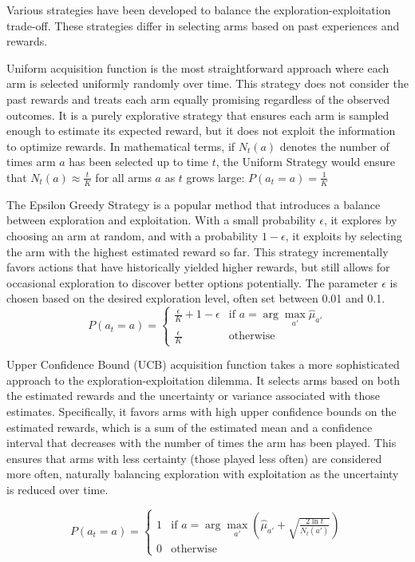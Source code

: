 \documentclass[
  letterpaper,
  DIV=11,
  numbers=noendperiod,
  oneside]{scrreprt}
\theoremstyle{remark}
\begin{document}
Various strategies have been developed to balance the
exploration-exploitation trade-off. These strategies differ in selecting
arms based on past experiences and rewards.

Uniform acquisition function is the most straightforward approach where
each arm is selected uniformly randomly over time. This strategy does
not consider the past rewards and treats each arm equally promising
regardless of the observed outcomes. It is a purely explorative strategy
that ensures each arm is sampled enough to estimate its expected reward,
but it does not exploit the information to optimize rewards. In
mathematical terms, if \(N_t(a)\) denotes the number of times arm \(a\)
has been selected up to time \(t\), the Uniform Strategy would ensure
that \(N_t(a) \approx \frac{t}{K}\) for all arms \(a\) as \(t\) grows
large: \(P(a_t = a) = \frac{1}{K}\)

The Epsilon Greedy Strategy is a popular method that introduces a
balance between exploration and exploitation. With a small probability
\(\epsilon\), it explores by choosing an arm at random, and with a
probability \(1 - \epsilon\), it exploits by selecting the arm with the
highest estimated reward so far. This strategy incrementally favors
actions that have historically yielded higher rewards, but still allows
for occasional exploration to discover better options potentially. The
parameter \(\epsilon\) is chosen based on the desired exploration level,
often set between 0.01 and 0.1. \[P(a_t = a) =
\begin{cases} 
\frac{\epsilon}{K} + 1 - \epsilon & \text{if } a = \arg\max_{a'} \hat{\mu}_{a'} \\
\frac{\epsilon}{K} & \text{otherwise}
\end{cases}\]

Upper Confidence Bound (UCB) acquisition function takes a more
sophisticated approach to the exploration-exploitation dilemma. It
selects arms based on both the estimated rewards and the uncertainty or
variance associated with those estimates. Specifically, it favors arms
with high upper confidence bounds on the estimated rewards, which is a
sum of the estimated mean and a confidence interval that decreases with
the number of times the arm has been played. This ensures that arms with
less certainty (those played less often) are considered more often,
naturally balancing exploration with exploitation as the uncertainty is
reduced over time.

\[P(a_t = a) =
\begin{cases} 
1 & \text{if } a = \arg\max_{a'} \left( \hat{\mu}_{a'} + \sqrt{\frac{2 \ln t}{N_t(a')}} \right) \\
0 & \text{otherwise}
\end{cases}\]
\end{document}
